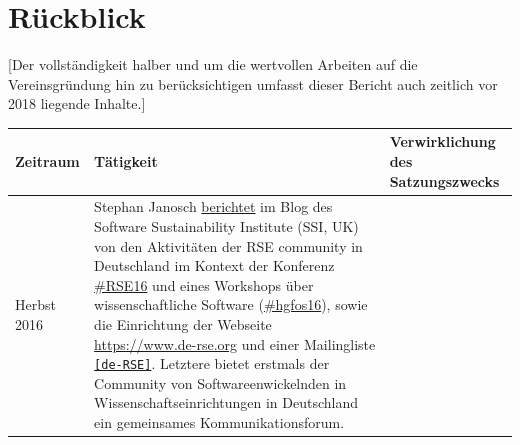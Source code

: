 \documentclass[a4paper]{article}
\begin{document}
\section{Rückblick}

[Der vollständigkeit halber und um die wertvollen Arbeiten auf die Vereinsgründung hin zu berücksichtigen umfasst dieser Bericht auch zeitlich vor 2018 liegende Inhalte.]

\begin{center}
\begin{longtable}{| p{} | p{} | p{} |}
\hline
\textbf{Zeitraum} & \textbf{Tätigkeit} & \textbf{Verwirklichung des Satzungszwecks} \\
\hline
Herbst 2016 & Stephan Janosch \href{https://www.software.ac.uk/blog/2016-12-19-research-software-germany-brief-report-efforts-autumn-2016}{berichtet} im Blog des Software Sustainability Institute (SSI, UK) von den Aktivitäten der RSE community in Deutschland im Kontext der Konferenz \href{https://ukrse.github.io/conf2016.html}{\#RSE16} und eines Workshops über wissenschaftliche Software (\href{https://twitter.com/hashtag/hgfos16}{\#hgfos16}), sowie die Einrichtung der Webseite \href{https://www.de-rse.org}{https://www.de-rse.org} und einer Mailingliste \href{https://ml-cgn04.ispgateway.de/mailman/listinfo/liste_de-rse.org}{\texttt{[de-RSE]}}. Letztere bietet erstmals der Community von Softwareenwickelnden in Wissenschaftseinrichtungen in Deutschland ein gemeinsames Kommunikationsforum. & \\
\hline

\end{longtable}
\end{center}
\end{document}
